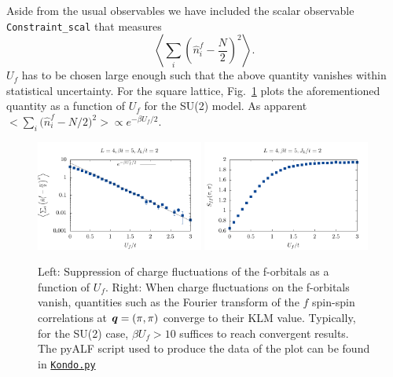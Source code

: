 Aside from the usual observables  we have included  the scalar observable \texttt{Constraint\_scal}    that measures 
\begin{equation}
	\left<    \sum_{i}   \left( \hat{n}_i^f - \frac{N}{2} \right)^2 \right>.
\end{equation}
$U_f$ has to be chosen large enough  such that  the above quantity vanishes within statistical uncertainty.  For the square lattice,  Fig.~\ref{Constraint.fig}   plots   the  aforementioned quantity as a function of $U_f$  for the SU(2) model.  As apparent $ \Big<    \sum_{i}   \big( \hat{n}_i^f - N/2 \big)^2 \Big> \propto e^{-\beta U_f/2} $.
\begin{figure}
\center
\includegraphics[width=0.49\textwidth]{Constraint.pdf}
\includegraphics[width=0.49\textwidth]{Spin.pdf}

\caption{Left:  Suppression of charge fluctuations of the f-orbitals as a function of $U_f$.  Right:   When  charge fluctuations  on the f-orbitals vanish, quantities such as the Fourier transform of the $f$ spin-spin  correlations at $\boldsymbol{q} = (\pi,\pi) $  converge to their KLM value. Typically,  for the SU(2) case, $\beta U_f > 10 $ suffices to reach convergent results.
The pyALF script used to produce the data of  the plot can be found in \href{https://git.physik.uni-wuerzburg.de/ALF/ALF/-/blob/ALF-2.0/Documentation/Figures/Kondo/Kondo.py}{\texttt{Kondo.py}}  }
        \label{Constraint.fig}
\end{figure}


